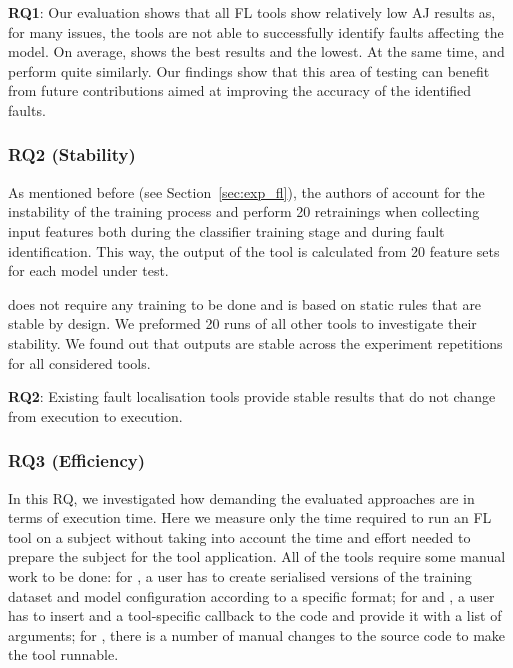 \begin{tcolorbox}[colback = box-white]
  \textbf{RQ1}: Our evaluation shows that all FL tools show relatively low AJ results as, for many issues, the tools are not able to successfully identify faults affecting the model. On average, \dfd shows the best results and \DD the lowest. At the same time, \NL and \UM perform quite similarly. Our findings show that this area of testing can benefit from future contributions aimed at improving the accuracy of the identified faults.
\end{tcolorbox}

\subsubsection{RQ2 (Stability)}

As mentioned before (see Section~\ref{sec:exp_fl}), the authors of \dfd account for the instability of the training process and perform 20 retrainings when collecting input features both during the classifier training stage and during fault identification. This way, the output of the tool is calculated from 20 feature sets for each model under test.

\NL does not require any training to be done and is based on static rules that are stable by design. We preformed 20 runs of all other tools to investigate their stability. We found out that outputs are stable across the experiment repetitions for all considered tools.


\begin{tcolorbox}[colback = box-white]
  \textbf{RQ2}: Existing fault localisation tools provide stable results that do not change from execution to execution.
\end{tcolorbox}

\subsubsection{RQ3 (Efficiency)}

In this RQ, we investigated how demanding the evaluated approaches are in terms of execution time. Here we measure only the time required to run an FL tool on a subject without taking into account the time and effort needed to prepare the subject for the tool application. All of the tools require some manual work to be done: for \dfd, a user has to create serialised versions of the training dataset and model configuration according to a specific format; for \DD and \UM, a user has to insert and a tool-specific callback to the code and provide it with a list of arguments; for \NL, there is a number of manual changes to the source code to make the tool runnable.

